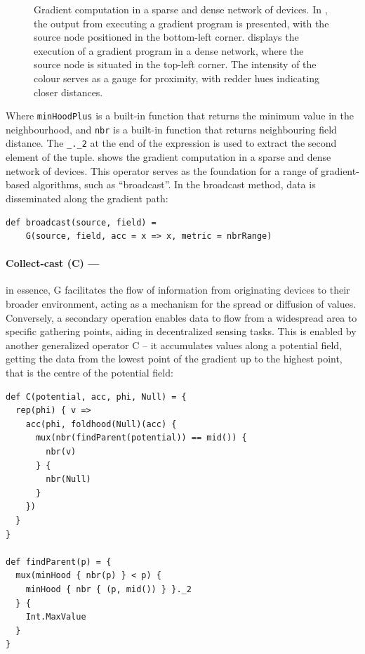 \begin{figure}
\begin{subfigure}{0.4\textwidth}
        \caption{}\label{fig:gradient-full}
    \end{subfigure}
    \caption{Gradient computation in a sparse and dense network of devices. In , the output from executing a gradient program is presented, with the source node positioned in the bottom-left corner. 
     displays the execution of a gradient program in a dense network, where the source node is situated in the top-left corner. The intensity of the colour serves as a gauge for proximity, with redder hues indicating closer distances.}\label{fig:gradient-computation}
\end{figure}

Where \texttt{minHoodPlus} is a built-in function that returns the minimum value in the neighbourhood, 
 and \texttt{nbr} is a built-in function that returns neighbouring field distance.
 The \lstinline|_._2| at the end of the expression is used to extract the second element of the tuple.
 shows the gradient computation in a sparse and dense network of devices.
This operator serves as the foundation for a range of gradient-based algorithms, 
 such as ``broadcast''. 
 In the broadcast method, data is disseminated along the gradient path:
\begin{lstlisting}
def broadcast(source, field) =
    G(source, field, acc = x => x, metric = nbrRange)
\end{lstlisting}
\paragraph*{Collect-cast (C) --- }
in essence, G facilitates the flow of information from originating devices to their broader environment, 
 acting as a mechanism for the spread or diffusion of values. 
 Conversely, a secondary operation enables data to flow from a widespread area to specific gathering points, 
 aiding in decentralized sensing tasks. 
 This is enabled by another generalized operator C -- 
 it accumulates values along a potential field, getting the data from the lowest point of the gradient up to the highest point, that is the centre of the potential field:
\begin{lstlisting}[language=scafi]
def C(potential, acc, phi, Null) = {
  rep(phi) { v =>
    acc(phi, foldhood(Null)(acc) {
      mux(nbr(findParent(potential)) == mid()) {
        nbr(v)
      } { 
        nbr(Null)
      }
    })
  }
}

def findParent(p) = {
  mux(minHood { nbr(p) } < p) {
    minHood { nbr { (p, mid()) } }._2
  } { 
    Int.MaxValue 
  }
}
\end{lstlisting}
